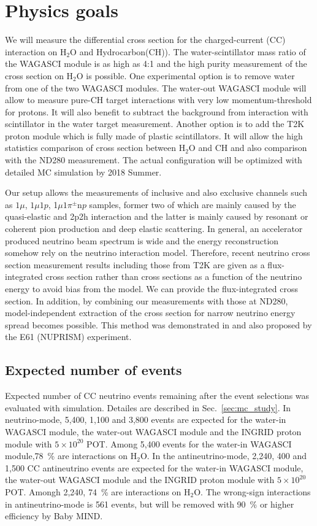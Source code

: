 \section{Physics goals}
We will measure the differential cross section for the charged-current (CC) interaction on $\mathrm{H_2O}$ and Hydrocarbon(CH)).
The water-scintillator mass ratio of the WAGASCI module is as high as 4:1 and the high purity measurement
of the cross section on $\mathrm{H_2O}$ is possible.
One experimental option is to remove water from one of the two WAGASCI modules. 
The water-out WAGASCI module will allow to measure pure-CH target interactions with very low momentum-threshold for protons.
It will also benefit to subtract the background from interaction with scintillator in the water target measurement.
Another option is to add the T2K proton module which is fully made of plastic scintillators.
It will allow the high statistics comparison of cross section between $\mathrm{H_2O}$ and CH and also comparison
with the ND280 measurement. The actual configuration will be optimized with detailed MC simulation by 2018 Summer.

Our setup allows the measurements of inclusive and also exclusive channels such as
$1\mu$, $1\mu 1p$, 1$\mu 1\pi^\pm \mathrm{n}p$ samples, former two of which are mainly caused by the quasi-elastic and
2p2h interaction and the latter is mainly caused by resonant or coherent pion production and deep elastic scattering.
In general, an accelerator produced neutrino beam spectrum is wide and the energy reconstruction
somehow rely on the neutrino interaction model.
Therefore, recent neutrino cross section measurement results including those from T2K are given
as a flux-integrated cross section rather than cross sections as a function of the neutrino energy to avoid bias from the model.
We can provide the flux-integrated cross section.
In addition, by combining our measurements with those at ND280, model-independent extraction of the cross section
for narrow neutrino energy spread becomes possible.
This method was demonstrated in \cite{Abe:2015biq} and also proposed by the E61 (NUPRISM) experiment.

\subsection{Expected number of events}
Expected number of CC neutrino events remaining after the event selections was evaluated with simulation.
Detailes are described in Sec.~\ref{sec:mc_study}.
In neutrino-mode, 5,400, 1,100 and 3,800 events are expected for the water-in WAGASCI module, the water-out WAGASCI module and the INGRID proton module with $5\times 10^{20}$ POT.  Among 5,400 events for the water-in WAGASCI module,78~\%  are interactions on $\mathrm{H_2O}$.
In the antineutrino-mode, 2,240, 400 and 1,500 CC antineutrino events are expected for the water-in WAGASCI module, the water-out WAGASCI module and the INGRID proton module with $5\times 10^{20}$ POT. Amongh 2,240, 74~\% are interactions on $\mathrm{H_2O}$.
The wrong-sign interactions in antineutrino-mode is 561 events, but will be removed with 90~\% or higher efficiency by Baby MIND.

